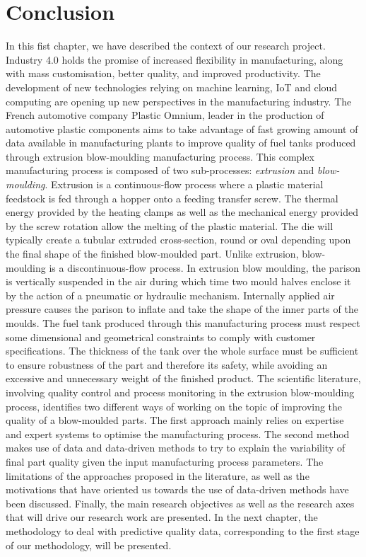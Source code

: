 
\section{Conclusion}

In this fist chapter, we have described the context of our research project. Industry 4.0 holds the promise of increased flexibility in manufacturing, along with mass customisation, better quality, and improved productivity. The development of new technologies relying on machine learning, IoT and cloud computing are opening up new perspectives in the manufacturing industry. The French automotive company Plastic Omnium, leader in the production of automotive plastic components aims to take advantage of fast growing amount of data available in manufacturing plants to improve quality of fuel tanks produced through extrusion blow-moulding manufacturing process. This complex manufacturing process is composed of two sub-processes: \textit{extrusion} and \textit{blow-moulding}. Extrusion is a continuous-flow process where a plastic material feedstock is fed through a hopper onto a feeding transfer screw. The thermal energy provided by the heating clamps as well as the mechanical energy provided by the screw rotation allow the melting of the plastic material. The die will typically create a tubular extruded cross-section, round or oval depending upon the final shape of the finished blow-moulded part. Unlike extrusion, blow-moulding is a discontinuous-flow process. In extrusion blow moulding, the parison is vertically suspended in the air during which time two mould halves enclose it by the action of a pneumatic or hydraulic mechanism. Internally applied air pressure causes the parison to inflate and take the shape of the inner parts of the moulds. The fuel tank produced through this manufacturing process must respect some dimensional and geometrical constraints to comply with customer specifications. The thickness of the tank over the whole surface must be sufficient to ensure robustness of the part and therefore its safety, while avoiding an excessive and unnecessary weight of the finished product. The scientific literature, involving quality control and process monitoring in the extrusion blow-moulding process, identifies two different ways of working on the topic of improving the quality of a blow-moulded parts. The first approach mainly relies on expertise and expert systems to optimise the manufacturing process. The second method makes use of data and data-driven methods to try to explain the variability of final part quality given the input manufacturing process parameters. The limitations of the approaches proposed in the literature, as well as the motivations that have oriented us towards the use of data-driven methods have been discussed. Finally, the main research objectives as well as the research axes that will drive our research work are presented. In the next chapter, the methodology to deal with predictive quality data, corresponding to the first stage of our methodology, will be presented.

